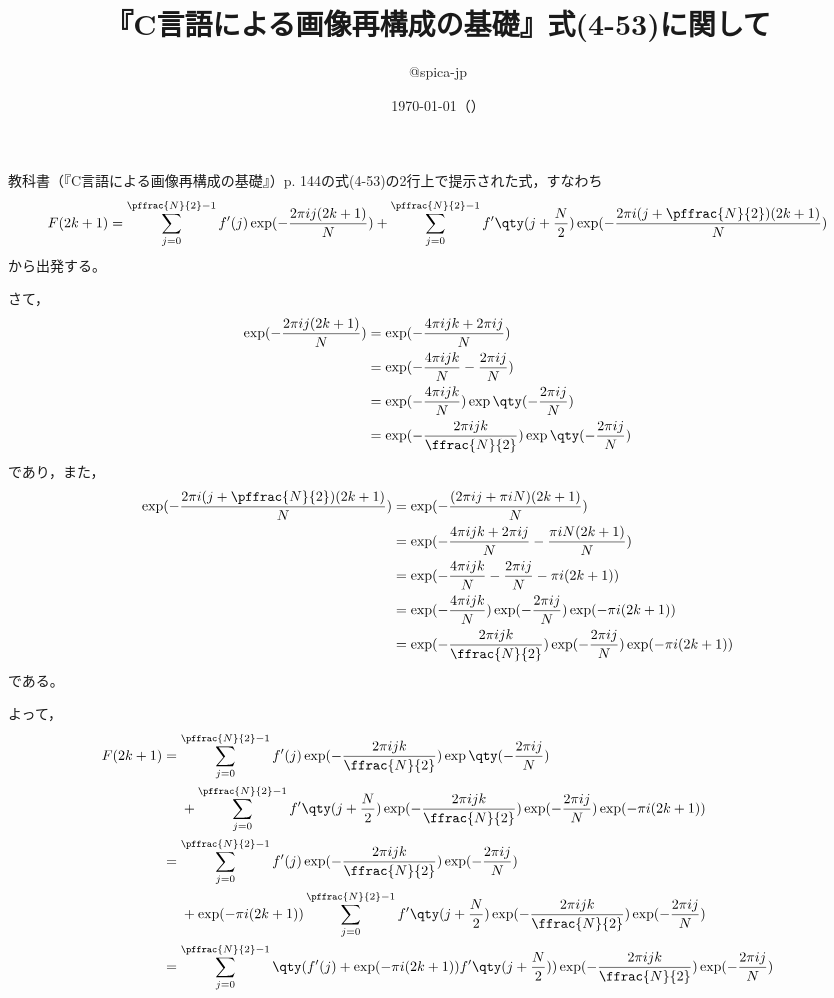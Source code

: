 \documentclass{ltjsarticle}
\begin{document}
\title{『C言語による画像再構成の基礎』式(4-53)に関して}
\author{@spica-jp}
\date{\today（\jpndow）}
\maketitle
教科書（『C言語による画像再構成の基礎』）p. 144の式(4-53)の2行上で提示された式，すなわち
\begin{equation}
F(2k+1)=\sum_{j=0}^{\pffrac{N}{2}-1}f'(j)\exp(-\frac{2\pi ij(2k+1)}{N})+\sum_{j=0}^{\pffrac{N}{2}-1}f'\qty(j+\frac{N}{2})\exp(-\frac{2\pi i(j+\pffrac{N}{2})(2k+1)}{N})
\end{equation}
から出発する。\par
さて，
\begin{align}
\exp(-\frac{2\pi ij(2k+1)}{N})
&=\exp(-\frac{4\pi ijk+2\pi ij}{N})\\
&=\exp(-\frac{4\pi ijk}{N}-\frac{2\pi ij}{N})\\
&=\exp(-\frac{4\pi ijk}{N})\exp\qty(-\frac{2\pi ij}{N})\\
&=\exp(-\frac{2\pi ijk}{\ffrac{N}{2}})\exp\qty(-\frac{2\pi ij}{N})
\end{align}
であり，また，
\begin{align}
\exp(-\frac{2\pi i(j+\pffrac{N}{2})(2k+1)}{N})
&=\exp(-\frac{(2\pi ij+\pi iN)(2k+1)}{N})\\
&=\exp(-\frac{4\pi ijk+2\pi ij}{N}-\frac{\pi iN(2k+1)}{N})\\
&=\exp(-\frac{4\pi ijk}{N}-\frac{2\pi ij}{N}-\pi i(2k+1))\\
&=\exp(-\frac{4\pi ijk}{N})\exp(-\frac{2\pi ij}{N})\exp(-\pi i(2k+1))\\
&=\exp(-\frac{2\pi ijk}{\ffrac{N}{2}})\exp(-\frac{2\pi ij}{N})\exp(-\pi i(2k+1))
\end{align}
である。\par
よって，
\begin{align}
F(2k+1)
&=\sum_{j=0}^{\pffrac{N}{2}-1}f'(j)\exp(-\frac{2\pi ijk}{\ffrac{N}{2}})\exp\qty(-\frac{2\pi ij}{N})\\
&\phantom{{}={}}+\sum_{j=0}^{\pffrac{N}{2}-1}f'\qty(j+\frac{N}{2})\exp(-\frac{2\pi ijk}{\ffrac{N}{2}})\exp(-\frac{2\pi ij}{N})\exp(-\pi i(2k+1))\\
&=\sum_{j=0}^{\pffrac{N}{2}-1}f'(j)\exp(-\frac{2\pi ijk}{\ffrac{N}{2}})\exp(-\frac{2\pi ij}{N})\\
&\phantom{{}={}}+\exp(-\pi i(2k+1))\sum_{j=0}^{\pffrac{N}{2}-1}f'\qty(j+\frac{N}{2})\exp(-\frac{2\pi ijk}{\ffrac{N}{2}})\exp(-\frac{2\pi ij}{N})\\
&=\sum_{j=0}^{\pffrac{N}{2}-1}\qty(f'(j)+\exp(-\pi i(2k+1))f'\qty(j+\frac{N}{2}))\exp(-\frac{2\pi ijk}{\ffrac{N}{2}})\exp(-\frac{2\pi ij}{N})
\end{align}
\end{document}
